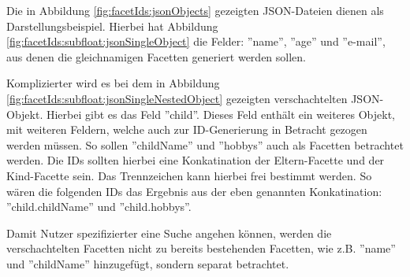 Die in Abbildung \ref{fig:facetIds:jsonObjects} gezeigten JSON-Dateien dienen als Darstellungsbeispiel.
Hierbei hat Abbildung \ref{fig:facetIds:subfloat:jsonSingleObject} die Felder: ''name'', ''age'' und ''e-mail'', aus denen die gleichnamigen Facetten generiert werden sollen.

Komplizierter wird es bei dem in Abbildung \ref{fig:facetIds:subfloat:jsonSingleNestedObject} gezeigten verschachtelten JSON-Objekt.
Hierbei gibt es das Feld ''child''. 
Dieses Feld enthält ein weiteres Objekt, mit weiteren Feldern, welche auch zur ID-Generierung in Betracht gezogen werden müssen. 
So sollen ''childName'' und ''hobbys'' auch als Facetten betrachtet werden.
Die IDs sollten hierbei eine Konkatination der Eltern-Facette und der Kind-Facette sein. Das Trennzeichen kann hierbei frei bestimmt werden.
So wären die folgenden IDs das Ergebnis aus der eben genannten Konkatination: ''child.childName'' und ''child.hobbys''.

Damit Nutzer spezifizierter eine Suche angehen können, werden die verschachtelten Facetten nicht zu bereits bestehenden Facetten, wie z.B. ''name'' und ''childName'' hinzugefügt, sondern separat betrachtet.